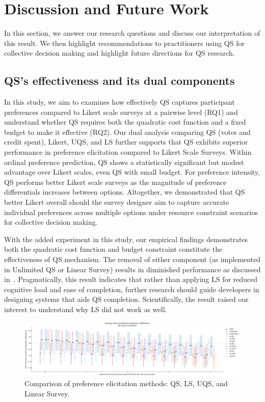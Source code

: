 \section{Discussion and Future Work}
\label{sec:discussion}
In this section, we answer our research questions and discuss our interpretation of this result. We then highlight recommendations to practitioners using QS for collective decision making and highlight future directions for QS research.

\subsection{QS's effectiveness and its dual components}
In this study, we aim to examines how effectively QS captures participant preferences compared to Likert scale surveys at a pairwise level (RQ1) and understand whether QS requires both the quadratic cost function and a fixed budget to make it effective (RQ2). Our dual analysis comparing QS (votes and credit spent), Likert, UQS, and LS further supports that QS exhibits superior performance in preference elicitation compared to Likert Scale Surveys. Within ordinal preference prediction, QS shows a statistically significant but modest advantage over Likert scales, even QS with small budget. For preference intensity, QS performs better Likert scale surveys as the magnitude of preference differentials increases between options. Altogether, we demonstrated that QS better Likert overall should the survey designer aim to capture accurate individual preferences across multiple options under resource constraint scenarios for collective decision making.

With the added experiment in this study, our empirical findings demonstrates both the quadratic cost function and budget constraint constitute the effectiveness of QS mechanism. The removal of either component (as implemented in Unlimited QS or Linear Survey) results in diminished performance as discussed in~. Pragmatically, this result indicates that rather than applying LS for reduced cognitive load and ease of completion, further research should guide developers in designing systems that aids QS completion. Scientifically, the result raised our interest to understand why LS did not work as well.

\begin{figure}[h]
    \centering
    \includegraphics[width=\textwidth]{content/image/Predicted_Donation_Diff_Interval.pdf}
    \caption{Comparison of preference elicitation methods: QS, LS, UQS, and Linear Survey.}
    \label{fig:comparison}
\end{figure}

